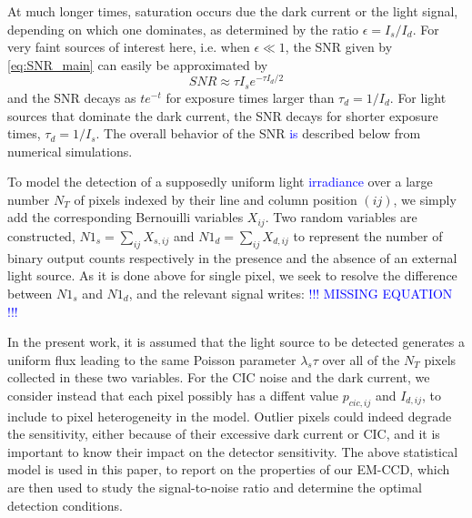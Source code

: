 \documentclass{article}
\begin{document}
At much longer times, saturation occurs due the dark current or the light signal, depending on which one dominates, as determined by the ratio $\epsilon=I_{s}/I_{d}$.
For very faint sources of interest here, i.e. when $\epsilon \ll 1$, the SNR given by \eqref{eq:SNR_main} can easily be approximated by 
\begin{equation}
    SNR \approx \tau I_{s} e^{-\tau I_{d}/2} 
\end{equation}
and the SNR decays as $t e^{-t}$ for exposure times larger than $\tau_{d} = 1/I_{d} $.
For light sources that dominate the dark current, the SNR decays for shorter exposure times, $\tau_{d} = 1/I_{s} $.
The overall behavior of the SNR \textcolor{blue}{is} described below from numerical simulations.


To model the detection of a supposedly uniform light \textcolor{blue}{irradiance} over a large number $N_T$ of pixels indexed by their line and column position $(ij)$, we simply add the corresponding Bernouilli variables $X_{ij}$. 
Two random variables are constructed,  
$N1_{s} = \sum_{ij} X_{s,ij}$ and $N1_d = \sum_{ij} X_{d,ij}$ 
to represent the number of binary output counts respectively in the presence and the absence of an external light source.
As it is done above for single pixel, we seek to resolve the difference between $N1_s$ and $N1_d$, and the relevant signal writes: \textcolor{blue}{!!! MISSING EQUATION !!!}

In the present work, it is assumed that the light source to be detected generates a uniform flux leading to the same Poisson parameter $\lambda_{s} \tau$ over all of the $N_T$ pixels collected in these two variables.
For the CIC noise and the dark current, we consider instead that each pixel possibly has a diffent value $p_{cic,ij}$ and $I_{d,ij}$, to include to pixel heterogeneity in the model.
Outlier pixels could indeed degrade the sensitivity, either because of their excessive dark current or CIC, and it is important to know their impact on the detector sensitivity.
The above statistical model is used in this paper, to report on the properties of our EM-CCD, which are then used to study the signal-to-noise ratio and determine the optimal detection conditions.
\end{document}
